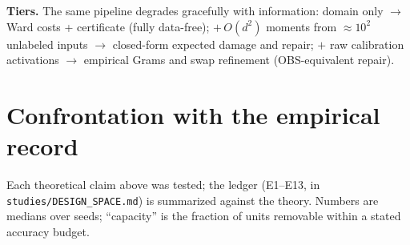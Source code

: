 \documentclass[11pt]{article}
\theoremstyle{remark}
\begin{document}
\textbf{Tiers.} The same pipeline degrades gracefully with information:
domain only $\to$ Ward costs + certificate (fully data-free);
$+\,O(d^2)$ moments from $\approx 10^2$ unlabeled inputs $\to$ closed-form
expected damage and repair; $+$ raw calibration activations $\to$ empirical
Grams and swap refinement (OBS-equivalent repair).

\section{Confrontation with the empirical record}\label{sec:evidence}

Each theoretical claim above was tested; the ledger (E1--E13, in
\texttt{studies/DESIGN\_SPACE.md}) is summarized against the theory. Numbers
are medians over seeds; ``capacity'' is the fraction of units removable
within a stated accuracy budget.
\end{document}
